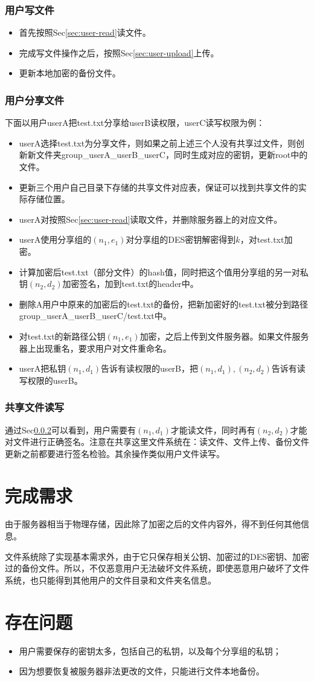 \documentclass[11pt, oneside]{ctexart}
\begin{document}
\subsubsection{用户写文件}
\begin{itemize}
\item 首先按照Sec\ref{sec:user-read}读文件。
\item 完成写文件操作之后，按照Sec\ref{sec:user-upload}上传。
\item 更新本地加密的备份文件。
\end{itemize}

\subsubsection{用户分享文件}\label{sec:share}
下面以用户userA把test.txt分享给userB读权限，userC读写权限为例：
\begin{itemize}
\item userA选择test.txt为分享文件，则如果之前上述三个人没有共享过文件，则创新新文件夹group\_userA\_userB\_userC，同时生成对应的密钥，更新root中的文件。
\item 更新三个用户自己目录下存储的共享文件对应表，保证可以找到共享文件的实际存储位置。
\item userA对按照Sec\ref{sec:user-read}读取文件，并删除服务器上的对应文件。
\item userA使用分享组的$(n_1, e_1)$对分享组的DES密钥解密得到$k$，对test.txt加密。
\item 计算加密后test.txt（部分文件）的hash值，同时把这个值用分享组的另一对私钥$(n_2, d_2)$加密签名，加到test.txt的header中。
\item 删除A用户中原来的加密后的test.txt的备份，把新加密好的test.txt被分到路径group\_userA\_userB\_userC/test.txt中。
\item 对test.txt的新路径公钥$(n_1, e_1)$加密，之后上传到文件服务器。如果文件服务器上出现重名，要求用户对文件重命名。
\item userA把私钥$(n_1, d_1)$告诉有读权限的userB，把$(n_1, d_1), (n_2, d_2)$告诉有读写权限的userB。
\end{itemize}

\subsubsection{共享文件读写}
通过Sec\ref{sec:share}可以看到，用户需要有$(n_1, d_1)$才能读文件，同时再有$(n_2, d_2)$才能对文件进行正确签名。注意在共享这里文件系统在：读文件、文件上传、备份文件更新之前都要进行签名检验。其余操作类似用户文件读写。

\section{完成需求}
由于服务器相当于物理存储，因此除了加密之后的文件内容外，得不到任何其他信息。

文件系统除了实现基本需求外，由于它只保存相关公钥、加密过的DES密钥、加密过的备份文件。所以，不仅恶意用户无法破坏文件系统，即使恶意用户破坏了文件系统，也只能得到其他用户的文件目录和文件夹名信息。

\section{存在问题}
\begin{itemize}
\item 用户需要保存的密钥太多，包括自己的私钥，以及每个分享组的私钥；
\item 因为想要恢复被服务器非法更改的文件，只能进行文件本地备份。
\end{itemize}
\end{document}
